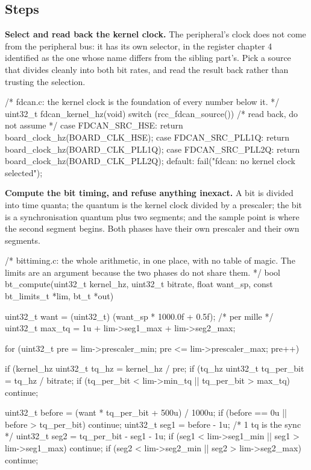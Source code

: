 \subsection*{Steps}

\begin{steps}
\item \textbf{Select and read back the kernel clock.} The peripheral's clock
does not come from the peripheral bus: it has its own selector, in the register
chapter 4 identified as the one whose name differs from the sibling part's. Pick
a source that divides cleanly into both bit rates, and read the result back
rather than trusting the selection.
\begin{ccode}
/* fdcan.c: the kernel clock is the foundation of every number below it. */
uint32_t fdcan_kernel_hz(void)
{
    switch (rcc_fdcan_source()) {                /* read back, do not assume */
        case FDCAN_SRC_HSE:  return board_clock_hz(BOARD_CLK_HSE);
        case FDCAN_SRC_PLL1Q: return board_clock_hz(BOARD_CLK_PLL1Q);
        case FDCAN_SRC_PLL2Q: return board_clock_hz(BOARD_CLK_PLL2Q);
        default: fail("fdcan: no kernel clock selected");
    }
}
\end{ccode}

\item \textbf{Compute the bit timing, and refuse anything inexact.} A bit is
divided into time quanta; the quantum is the kernel clock divided by a
prescaler; the bit is a synchronisation quantum plus two segments; and the
sample point is where the second segment begins. Both phases have their own
prescaler and their own segments.
\begin{ccode}
/* bittiming.c: the whole arithmetic, in one place, with no table of magic.
   The limits are an argument because the two phases do not share them. */
bool bt_compute(uint32_t kernel_hz, uint32_t bitrate, float want_sp,
                const bt_limits_t *lim, bt_t *out)
{
    uint32_t want = (uint32_t) (want_sp * 1000.0f + 0.5f);   /* per mille */
    uint32_t max_tq = 1u + lim->seg1_max + lim->seg2_max;

    for (uint32_t pre = lim->prescaler_min; pre <= lim->prescaler_max; pre++) {
        if (kernel_hz %
        uint32_t tq_hz = kernel_hz / pre;
        if (tq_hz %
        uint32_t tq_per_bit = tq_hz / bitrate;
        if (tq_per_bit < lim->min_tq || tq_per_bit > max_tq) continue;

        uint32_t before = (want * tq_per_bit + 500u) / 1000u;
        if (before == 0u || before > tq_per_bit) continue;
        uint32_t seg1 = before - 1u;                   /* 1 tq is the sync  */
        uint32_t seg2 = tq_per_bit - seg1 - 1u;
        if (seg1 < lim->seg1_min || seg1 > lim->seg1_max) continue;
        if (seg2 < lim->seg2_min || seg2 > lim->seg2_max) continue;

}}
\end{ccode}
\end{steps}
